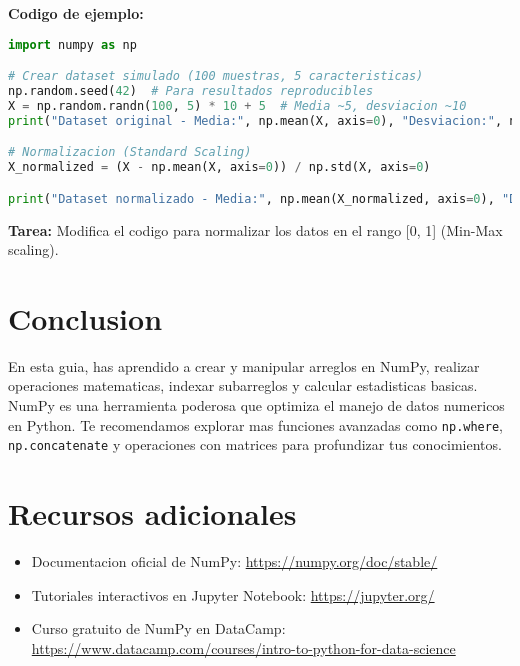 \documentclass[a4paper,12pt]{article}
\begin{document}
\textbf{Codigo de ejemplo:}

\begin{lstlisting}[language=Python]
import numpy as np

# Crear dataset simulado (100 muestras, 5 caracteristicas)
np.random.seed(42)  # Para resultados reproducibles
X = np.random.randn(100, 5) * 10 + 5  # Media ~5, desviacion ~10
print("Dataset original - Media:", np.mean(X, axis=0), "Desviacion:", np.std(X, axis=0))

# Normalizacion (Standard Scaling)
X_normalized = (X - np.mean(X, axis=0)) / np.std(X, axis=0)

print("Dataset normalizado - Media:", np.mean(X_normalized, axis=0), "Desviacion:", np.std(X_normalized, axis=0))
\end{lstlisting}

\textbf{Tarea:} Modifica el codigo para normalizar los datos en el rango [0, 1] (Min-Max scaling).

\section{Conclusion}
En esta guia, has aprendido a crear y manipular arreglos en NumPy, realizar operaciones matematicas, indexar subarreglos y calcular estadisticas basicas. NumPy es una herramienta poderosa que optimiza el manejo de datos numericos en Python. Te recomendamos explorar mas funciones avanzadas como \texttt{np.where}, \texttt{np.concatenate} y operaciones con matrices para profundizar tus conocimientos.

\section{Recursos adicionales}
\begin{itemize}
    \item Documentacion oficial de NumPy: \url{https://numpy.org/doc/stable/}
    \item Tutoriales interactivos en Jupyter Notebook: \url{https://jupyter.org/}
    \item Curso gratuito de NumPy en DataCamp: \url{https://www.datacamp.com/courses/intro-to-python-for-data-science}
\end{itemize}
\end{document}
